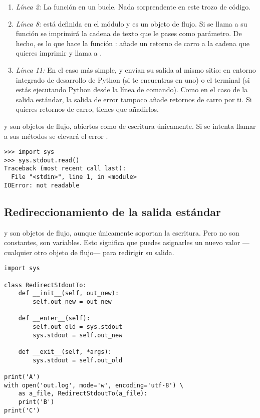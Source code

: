 \begin{enumerate}

\item \emph{Línea 2:} La función  en un bucle. Nada sorprendente en este trozo de código.

\item \emph{Línea 8:}  está definida en el módulo  y es un objeto de flujo. Si se llama a su función  se imprimirá la cadena de texto que le pases como parámetro. De hecho, es lo que hace la función : añade un retorno de carro a la cadena que quieres imprimir y llama a .

\item \emph{Línea 11:} En el caso más simple,  y  envían su salida al mismo sitio: en entorno integrado de desarrollo de Python (si te encuentras en uno) o el terminal (si estás ejecutando Python desde la línea de comando). Como en el caso de la salida estándar, la salida de error tampoco añade retornos de carro por ti. Si quieres retornos de carro, tienes que añadirlos.

\end{enumerate}

 y  son objetos de flujo, abiertos como de escritura únicamente. Si se intenta llamar a sus métodos  se elevará el error .

\noindent\begin{minipage}{\textwidth}
\begin{lstlisting}[mathescape=True]
>>> import sys
>>> sys.stdout.read()
Traceback (most recent call last):
  File "<stdin>", line 1, in <module>
IOError: not readable
\end{lstlisting}
\end{minipage}

\subsection{Redireccionamiento de la salida estándar}

 y  son objetos de flujo, aunque únicamente soportan la escritura. Pero no son constantes, son variables. Esto significa que puedes asignarles un nuevo valor ---cualquier otro objeto de flujo--- para redirigir su salida.

\noindent\begin{minipage}{\textwidth}
\begin{lstlisting}[mathescape=True]
import sys

class RedirectStdoutTo:
    def __init__(self, out_new):
        self.out_new = out_new

    def __enter__(self):
        self.out_old = sys.stdout
        sys.stdout = self.out_new

    def __exit__(self, *args):
        sys.stdout = self.out_old

print('A')
with open('out.log', mode='w', encoding='utf-8') \
    as a_file, RedirectStdoutTo(a_file):
    print('B')
print('C')
\end{lstlisting}
\end{minipage}

